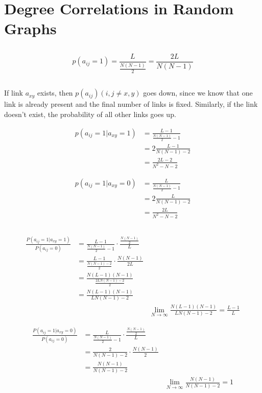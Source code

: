 \section{Degree Correlations in Random Graphs}
\subsection{}
$$ p(a_{ij} = 1) = \frac{ L }{ \frac{ N(N-1) }{ 2 } } = \frac{ 2L }{ N(N-1) } $$

\subsection{}
If link $ a_{xy} $ exists, then $ p(a_{ij}) (i,j \neq x,y) $ goes down, since we know that one link is already present and the final number of links is fixed. Similarly, if the link doesn't exist, the probability of all other links goes up.

\begin{align*}	
	p(a_{ij} = 1 | a_{xy} = 1) &= \frac{ L-1 }{ \frac{ N(N-1) }{ 2 } - 1 } \\
	&= 2 \frac{ L-1 }{ N(N-1) - 2 } \\
	&= \frac{ 2L-2 }{ N^2-N-2 }
\end{align*}

\begin{align*}	
	p(a_{ij} = 1 | a_{xy} = 0) &= \frac{ L }{ \frac{ N(N-1) }{ 2 } - 1 } \\
	&= 2 \frac{ L }{ N(N-1) - 2 } \\
	&= \frac{ 2L }{ N^2-N-2 }
\end{align*}

\subsection{}
\begin{align*}
	\frac{P \left( a_{ij} = 1 | a_{xy} = 1 \right)}{P \left( a_{ij}=0 \right)} &=\frac{L-1}{\frac{N(N-1)}{2}-1} \cdot \frac{\frac{N(N-1)}{2}}{L}\\
	&=\frac{L-1}{\frac{N(N-1)-2}{2}} \cdot \frac{N(N-1)}{2L}\\
	&= \frac{N(L-1)(N-1)}{\frac{2LN(N-1)-2}{2}}\\
	&= \frac{N(L-1)(N-1)}{LN(N-1)-2}\\
	&&\lim\limits_{N \to \infty}  \frac{N(L-1)(N-1)}{LN(N-1)-2} = \frac{L-1}{L}
\end{align*}

\begin{align*}
	\frac{P \left( a_{ij} = 1 | a_{xy} = 0 \right)}{P \left( a_{ij}=0 \right)} &=\frac{L}{\frac{N(N-1)}{2}-1} \cdot \frac{\frac{N(N-1)}{2}}{L}\\
	&= \frac{2}{N(N-1)-2} \cdot \frac{N(N-1)}{2}\\
	&= \frac{N(N-1)}{N(N-1)-2}\\
	&&\lim\limits_{N \to \infty} \frac{N(N-1)}{N(N-1)-2} = 1
\end{align*}


